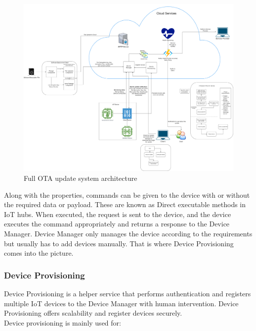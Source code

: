 \documentclass[12pt,a4paper]{article}
\begin{document}
{\begin{landscape}
\begin{figure}[h]
\centering
\includegraphics[scale=0.2 ]{OTA_architecture.drawio.png}
\caption{Full OTA update system architecture}
\label{OTA_architecture}
\end{figure}

\end{landscape}


Along with the properties, commands can be given to the device with or without the required data or payload. These are known as Direct executable methods in IoT hubs. When executed, the request is sent to the device, and the device executes the command appropriately and returns a response to the Device Manager. Device Manager only manages the device according to the requirements but usually has to add devices manually. That is where Device Provisioning comes into the picture. \cite{r36}

\subsubsection{Device Provisioning}

Device Provisioning is a helper service that performs authentication and registers multiple IoT devices to the Device Manager with human intervention. Device Provisioning offers scalability and register devices securely. \cite{r36} \\

Device provisioning is mainly used for:

\begin{itemize}


\end{itemize}}
\end{document}
